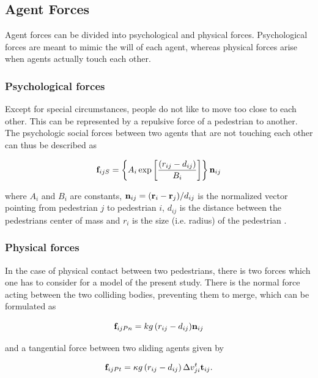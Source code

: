 \documentclass[11pt]{article}
\begin{document}
\subsection{Agent Forces}
Agent forces can be divided into psychological and physical forces. Psychological forces are meant to mimic the will of each agent, whereas physical forces arise when agents actually touch each other.

\subsubsection{Psychological forces}

Except for special circumstances, people do not like to move too close to each other. This can be represented by a repulsive force of a pedestrian to another. The psychologic social forces between two agents that are not touching each other can thus be described as

\begin{equation}
	{{\bf f}_{ijS}} = \left\{ {{A_i}\exp \left[ {\frac{{\left( {{r_{ij}} - {d_{ij}}} \right)}}{{{B_i}}}} \right] } \right\}{{\bf n}_{ij}} 
		\label{eq:fijS}
\end{equation}

where $A_i$ and $B_i$ are constants, ${\bf n}_{ij} = ({\bf r}_i - {\bf r}_j)/d_{ij}$ is the normalized vector pointing from pedestrian $j$ to pedestrian $i$, $d_{ij}$ is the distance between the pedestrians center of mass and $r_i$ is the size (i.e. radius) of the pedestrian \citep{Helbing2000}. 

\subsubsection{Physical forces}

In the case of physical contact between two pedestrians, there is two forces which one has to consider for a model of the present study. There is the normal force acting between the two colliding bodies, preventing them to merge, which can be formulated as

\begin{equation}
	{{\bf f}_{ijPn}} = {kg\left( {{r_{ij}} - {d_{ij}}} \right)} {{\bf n}_{ij}}
		\label{eq:fijPn}
\end{equation}

and a tangential force between two sliding agents given by

\begin{equation}
	{{\bf f}_{ijPt}} = \kappa g\left( {{r_{ij}} - {d_{ij}}} \right)\Delta v_{ji}^t{{\bf t}_{ij}} .
		\label{eq:fijPt}
\end{equation}
\end{document}
